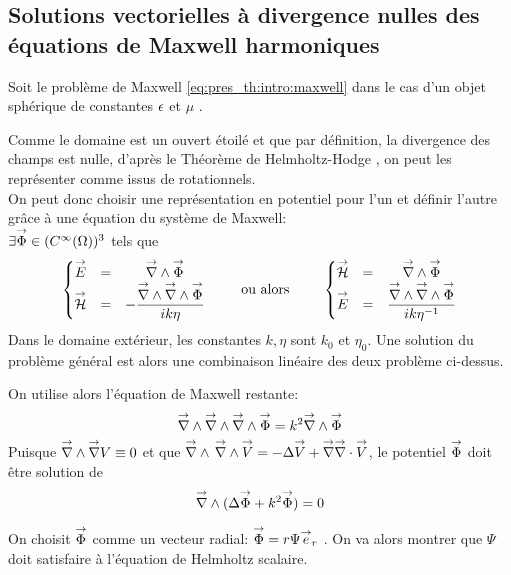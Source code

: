 \subsection{Solutions vectorielles à divergence nulles des équations de Maxwell harmoniques}
\label{sec:sol_maxwell}

Soit le problème de Maxwell \eqref{eq:pres_th:intro:maxwell} dans le cas d'un objet sphérique de constantes \(\epsilon\) et \(\mu\)%
.

Comme le domaine est un ouvert étoilé et que par définition, la divergence des champs est nulle, d'après le Théorème de Helmholtz-Hodge \cite{gui_rigorous_2007}, on peut les représenter comme issus de rotationnels.\\
On peut donc choisir une représentation en potentiel pour l'un et définir l'autre grâce à une équation du système de Maxwell:\\
 \(\exists {\overset{\rightarrow}{\Phi}} \in (C^\infty(\Omega))^3\) tels que
\begin{equation}
  \label{eq:sol_maxwell:pot_hertz}
  \left\lbrace\begin{matrix}
    \vE &=& \vrot \vect \Phi \\
    \vH &=& - \frac{\vrot \vrot \vect \Phi}{ik\eta}
  \end{matrix} \right.
  \qquad \text{ ou alors } \qquad
  \left\lbrace\begin{matrix}
    \vH &=& \vrot \vect \Phi\\
    \vE &=& \frac{\vrot \vrot \vect \Phi}{ik\eta^{-1}}\\
  \end{matrix}\right.
\end{equation}
Dans le domaine extérieur, les constantes \(k,\eta\) sont \(k_0\) et \(\eta_0\).
Une solution du problème général est alors une combinaison linéaire des deux problème ci-dessus.

On utilise alors l'équation de Maxwell restante:
\[
    {\overset{\rightarrow}{\nabla}}\wedge {\overset{\rightarrow}{\nabla}}\wedge {\overset{\rightarrow}{\nabla}}\wedge {\overset{\rightarrow}{\Phi}} = k^2 {\overset{\rightarrow}{\nabla}}\wedge {\overset{\rightarrow}{\Phi}}
\]
Puisque \({\overset{\rightarrow}{\nabla}}\wedge  {\overset{\rightarrow}{\nabla}}  V  \equiv 0\) et que \({\overset{\rightarrow}{\nabla}}\wedge\, {\overset{\rightarrow}{\nabla}}\wedge {\overset{\rightarrow}{V}} = -\Delta {\overset{\rightarrow}{V}} + {\overset{\rightarrow}{\nabla}} {\overset{\rightarrow}{\nabla}}\cdot {\overset{\rightarrow}{V}}\), le potentiel \({\overset{\rightarrow}{\Phi}}\) doit être solution de
\begin{equation}
  \label{eq:sol_maxwell:helmholtz_vect}
  \vrot ( \lapl \vect \Phi + k^2 \vect \Phi ) = 0
\end{equation}

On choisit \({\overset{\rightarrow}{\Phi}}\) comme un vecteur radial: \({\overset{\rightarrow}{\Phi}} = r \Psi {\overset{\rightarrow}{e}}_r\) \cite[p.~84]{bohren_absorption_2004}. On va alors montrer que \(\Psi\) doit satisfaire à l'équation de Helmholtz scalaire.\\


